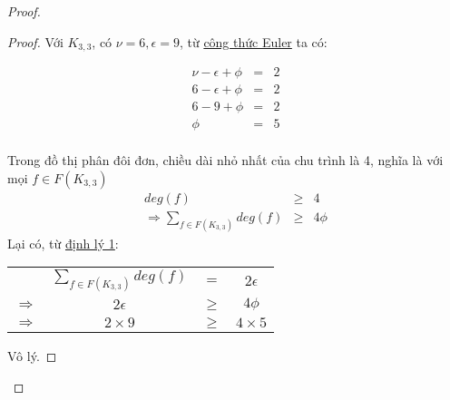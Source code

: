 \begin{proof}
\begin{proof}
        Với $K_{3,3}$, có $\nu = 6, \epsilon = 9$, từ \hyperref[thr:euler]{công thức Euler} ta có:
        \begin{figure}[H]
            \begin{minipage}{0.4\textwidth}
                \begin{eqnarray*}
                    \nu-\epsilon+\phi& = &2 \\
                    6-\epsilon+\phi& = & 2\\
                    6-9+\phi& = & 2\\
                    \phi& = & 5\\
                \end{eqnarray*}
            \end{minipage}
            \hfill
            \begin{minipage}{0.4\textwidth}
                \centering
            \end{minipage}
        \end{figure}
        Trong đồ thị phân đôi đơn, chiều dài nhỏ nhất của chu trình là 4, nghĩa là với mọi $f \in F(K_{3,3})$
        \begin{eqnarray*}
            deg(f)& \geq &4 \\
            \Rightarrow \sum_{f \in F(K_{3,3})}deg(f)& \geq & 4\phi
        \end{eqnarray*}
        Lại có, từ \hyperref[thr:v2e]{định lý 1}:
        \begin{center}
            \begin{tabular}{ c c c c }
                              & $\displaystyle \sum_{f \in F(K_{3,3})}deg(f)$ & $=$    & $2\epsilon$  \\
                $\Rightarrow$ & $2\epsilon $                                  & $\geq$ & $4\phi$      \\
                $\Rightarrow$ & $2 \times 9$                                  & $\geq$ & $4 \times 5$
            \end{tabular}
        \end{center}
        Vô lý.
    \end{proof}


\end{proof}
